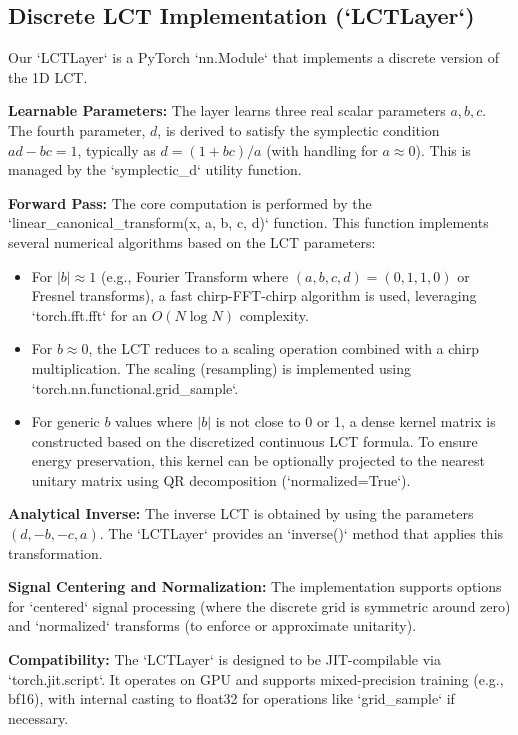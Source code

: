 \subsection{Discrete \textsc{LCT} Implementation (`LCTLayer`)}
Our `LCTLayer` is a PyTorch `nn.Module` that implements a discrete version of the 1D LCT.

\textbf{Learnable Parameters:} The layer learns three real scalar parameters \(a, b, c\). The fourth parameter, \(d\), is derived to satisfy the symplectic condition \(ad-bc=1\), typically as \(d = (1+bc)/a\) (with handling for \(a \approx 0\)). This is managed by the `symplectic_d` utility function.

\textbf{Forward Pass:} The core computation is performed by the `linear_canonical_transform(x, a, b, c, d)` function. This function implements several numerical algorithms based on the LCT parameters:
\begin{itemize}
  \item For \(|b| \approx 1\) (e.g., Fourier Transform where \((a,b,c,d)=(0,1,1,0)\) or Fresnel transforms), a fast chirp-FFT-chirp algorithm is used, leveraging `torch.fft.fft` for an \(O(N \log N)\) complexity.
  \item For \(b \approx 0\), the LCT reduces to a scaling operation combined with a chirp multiplication. The scaling (resampling) is implemented using `torch.nn.functional.grid_sample`.
  \item For generic \(b\) values where \(|b|\) is not close to 0 or 1, a dense kernel matrix is constructed based on the discretized continuous LCT formula. To ensure energy preservation, this kernel can be optionally projected to the nearest unitary matrix using QR decomposition (`normalized=True`).
\end{itemize}

\textbf{Analytical Inverse:} The inverse LCT is obtained by using the parameters \((d, -b, -c, a)\). The `LCTLayer` provides an `inverse()` method that applies this transformation.

\textbf{Signal Centering and Normalization:} The implementation supports options for `centered` signal processing (where the discrete grid is symmetric around zero) and `normalized` transforms (to enforce or approximate unitarity).

\textbf{Compatibility:} The `LCTLayer` is designed to be JIT-compilable via `torch.jit.script`. It operates on GPU and supports mixed-precision training (e.g., bf16), with internal casting to float32 for operations like `grid_sample` if necessary.

